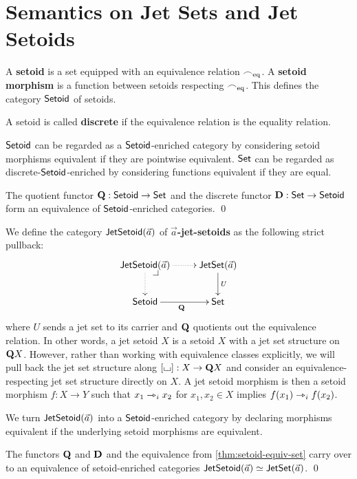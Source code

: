 \documentclass[a4paper]{memoir}
\begin{document}
\section{Semantics on Jet Sets and Jet Setoids} \label{sec:poresh-jetset}
\begin{definition} \label{def:setoid}
	A \textbf{setoid} is a set equipped with an equivalence relation ${\frown}_{{\mathrm{eq}}}$.
	A \textbf{setoid morphism} is a function between setoids respecting ${\frown}_{{\mathrm{eq}}}$.
	This defines the category ${\mathsf{Setoid}}$ of setoids.
	
	A setoid is called \textbf{discrete} if the equivalence relation is the equality relation.
	
	${\mathsf{Setoid}}$ can be regarded as a ${\mathsf{Setoid}}$-enriched category by considering setoid morphisms equivalent if they are pointwise equivalent.
	${\mathsf{Set}}$ can be regarded as discrete-${\mathsf{Setoid}}$-enriched by considering functions equivalent if they are equal.
\end{definition}
\begin{corollary} \label{thm:setoid-equiv-set}
	The quotient functor ${\mathbf{Q}} : {\mathsf{Setoid}} \to {\mathsf{Set}}$ and the discrete functor ${\mathbf{D}} : {\mathsf{Set}} \to {\mathsf{Setoid}}$ form an equivalence of ${\mathsf{Setoid}}$-enriched categories. \qed
\end{corollary}
\begin{definition} \label{def:jetsetoid}
	We define the category $\mathsf{JetSetoid}(\vec a)$ of \textbf{$\vec a$-jet-setoids} as the following strict pullback:
	\[
		\xymatrix{
			\jetsetoid{\vec a}
				\xydrcorner
				\ar@{.>}[r]
				\ar@{.>}[d]
			&
			\jetset{\vec a}
				\ar[d]^U
			\\
			\Setoid
				\ar[r]_\setoidquot
			&
			\Set
		}
	\]
	where $U$ sends a jet set to its carrier and ${\mathbf{Q}}$ quotients out the equivalence relation.
	In other words, a jet setoid $X$ is a setoid $X$ with a jet set structure on ${\mathbf{Q}} X$.
	However, rather than working with equivalence classes explicitly, we will pull back the jet set structure along $[{\llcorner\hspace{-.4ex}\lrcorner}] : X \to {\mathbf{Q}} X$ and consider an equivalence-respecting jet set structure directly on $X$.
	A jet setoid morphism is then a setoid morphism $f : X \to Y$ such that $x_1 \rightarrowtriangle_i x_2$ for $x_1, x_2 \in X$ implies $f(x_1) \rightarrowtriangle_i f(x_2)$.
	
	We turn $\mathsf{JetSetoid}(\vec a)$ into a ${\mathsf{Setoid}}$-enriched category by declaring morphisms equivalent if the underlying setoid morphisms are equivalent.
\end{definition}
\begin{corollary} \label{thm:jetsetoid-equiv-jetset}
	The functors ${\mathbf{Q}}$ and ${\mathbf{D}}$ and the equivalence from \cref{thm:setoid-equiv-set} carry over to an equivalence of setoid-enriched categories $\mathsf{JetSetoid}(\vec a) \simeq \mathsf{JetSet}(\vec a)$. \qed
\end{corollary}
\end{document}
